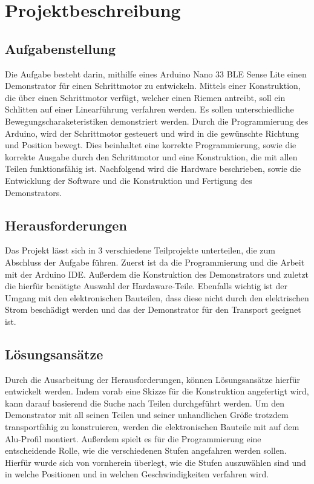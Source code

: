 

\chapter{Projektbeschreibung}

\section{Aufgabenstellung}

Die Aufgabe besteht darin, mithilfe eines Arduino Nano 33 BLE Sense Lite einen Demonstrator für einen Schrittmotor zu entwickeln. Mittels einer Konstruktion, die über einen Schrittmotor verfügt, welcher einen Riemen antreibt, soll ein Schlitten auf einer Linearführung verfahren werden. Es sollen unterschiedliche Bewegungscharaketeristiken demonstriert werden. Durch die Programmierung des Arduino, wird der Schrittmotor gesteuert und wird in die gewünschte Richtung und Position bewegt. Dies beinhaltet eine korrekte Programmierung, sowie die korrekte Ausgabe durch den Schrittmotor und eine Konstruktion, die mit allen Teilen funktionsfähig ist. Nachfolgend wird die Hardware beschrieben, sowie die Entwicklung der Software und die Konstruktion und Fertigung des Demonstrators.

\section{Herausforderungen}

Das Projekt lässt sich in 3 verschiedene Teilprojekte unterteilen, die zum Abschluss der Aufgabe führen. Zuerst ist da die Programmierung und die Arbeit mit der Arduino IDE. Außerdem die Konstruktion des Demonstrators und zuletzt die hierfür benötigte Auswahl der Hardaware-Teile. Ebenfalls wichtig ist der Umgang mit den elektronischen Bauteilen, dass diese nicht durch den elektrischen Strom beschädigt werden und das der Demonstrator für den Transport geeignet ist. 

\section{Lösungsansätze}

Durch die Ausarbeitung der Herausforderungen, können Lösungsansätze hierfür entwickelt werden. Indem vorab eine Skizze für die Konstruktion angefertigt wird, kann darauf basierend die Suche nach Teilen durchgeführt werden. Um den Demonstrator mit all seinen Teilen und seiner unhandlichen Größe trotzdem transportfähig zu konstruieren, werden die elektronischen Bauteile mit auf dem Alu-Profil montiert. Außerdem spielt es für die Programmierung eine entscheidende Rolle, wie die verschiedenen Stufen angefahren werden sollen. Hierfür wurde sich von vornherein überlegt, wie die Stufen auszuwählen sind und in welche Positionen und in welchen Geschwindigkeiten verfahren wird.




